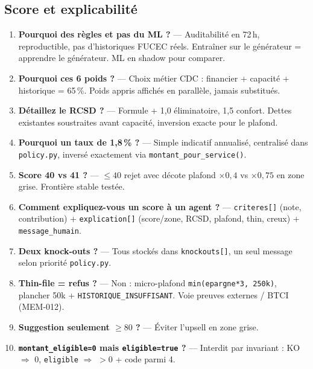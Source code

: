 \documentclass[11pt,a4paper]{article}
\newcommand{\C}[1]{{\small\texttt{\nolinkurl{#1}}}}
\begin{document}
\subsection{Score et explicabilité}
\begin{enumerate}
  \item \textbf{Pourquoi des règles et pas du ML ?} --- Auditabilité en 72\,h, reproductible, pas d'historiques FUCEC réels. Entraîner sur le générateur = apprendre le générateur. ML en shadow pour comparer.
  \item \textbf{Pourquoi ces 6 poids ?} --- Choix métier CDC : financier + capacité + historique = 65\,\%. Poids appris affichés en parallèle, jamais substitués.
  \item \textbf{Détaillez le RCSD ?} --- Formule + 1,0 éliminatoire, 1,5 confort. Dettes existantes soustraites avant capacité, inversion exacte pour le plafond.
  \item \textbf{Pourquoi un taux de 1,8\,\% ?} --- Simple indicatif annualisé, centralisé dans \C{policy.py}, inversé exactement via \C{montant_pour_service()}.
  \item \textbf{Score 40 vs 41 ?} --- $\leq 40$ rejet avec décote plafond $\times 0{,}4$ vs $\times 0{,}75$ en zone grise. Frontière stable testée.
  \item \textbf{Comment expliquez-vous un score à un agent ?} --- \texttt{criteres[]} (note, contribution) + \texttt{explication[]} (score/zone, RCSD, plafond, thin, creux) + \texttt{message\_humain}.
  \item \textbf{Deux knock-outs ?} --- Tous stockés dans \texttt{knockouts[]}, un seul message selon priorité \texttt{policy.py}.
  \item \textbf{Thin-file = refus ?} --- Non : micro-plafond \texttt{min(epargne*3, 250k)}, plancher 50k + \texttt{HISTORIQUE\_INSUFFISANT}. Voie preuves externes / BTCI (MEM-012).
  \item \textbf{Suggestion seulement $\geq 80$ ?} --- Éviter l'upsell en zone grise.
  \item \textbf{\texttt{montant\_eligible=0} mais \texttt{eligible=true} ?} --- Interdit par invariant : KO $\Rightarrow$ 0, \texttt{eligible} $\Rightarrow$ $>0$ + code parmi 4.
\end{enumerate}
\end{document}
